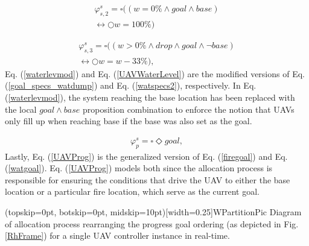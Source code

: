 \documentclass{ieeeaccess}
\newcommand{\always}{\square}
\newcommand{\eventually}{\Diamond}
\newcommand{\next}{\bigcirc}
\begin{document}
\begin{equation}
\begin{aligned}
\varphi_{s,2}^{s} = \always (( w = 0 \%  \land goal \land base) \\ \leftrightarrow \next w = 100\%)
\end{aligned}
\label{waterlevmod}
\end{equation}

\begin{equation}
\begin{aligned}
\varphi_{s,3}^{s} = \always (( w > 0 \%  \land drop \land goal \land \lnot base) \\ \leftrightarrow \next w = w - 33 \%),
\end{aligned}
\label{UAVWaterLevel}
\end{equation}
Eq. (\ref{waterlevmod}) and Eq. (\ref{UAVWaterLevel}) are the modified versions of Eq. (\ref{goal_specs_watdump}) and Eq. (\ref{watspecs2}), respectively. In Eq. (\ref{waterlevmod}), the system reaching the base location has been replaced with the local $goal \land base$ proposition combination to enforce the notion that UAVs only fill up when reaching base if the base was also set as the goal.

\begin{equation}
\begin{aligned}
\varphi_{p}^{s} = \always \eventually goal,
\end{aligned}
\label{UAVProg}
\end{equation}
Lastly, Eq. (\ref{UAVProg}) is the generalized version of Eq. (\ref{firegoal}) and Eq. (\ref{watgoal}). Eq. (\ref{UAVProg}) models both since the allocation process is responsible for ensuring the conditions that drive the UAV to either the base location or a particular fire location, which serve as the current goal.

\Figure[t!](topskip=0pt, botskip=0pt, midskip=10pt)[width=0.25\textwidth]{WPartitionPic}
{Diagram of allocation process rearranging the progress goal ordering (as depicted in Fig. \ref{RhFrame}) for a single UAV controller instance in real-time.\label{WPart}}
\end{document}
